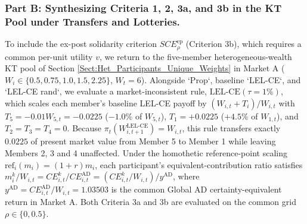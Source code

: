 \documentclass[11pt,a4paper]{article}
\theoremstyle{definition}
\theoremstyle{plain}
\theoremstyle{remark}
\newcommand{\1}{\mathbf{1}}
\begin{document}
\subsubsection*{Part B: Synthesizing Criteria 1, 2, 3a, and 3b in the KT Pool under Transfers and Lotteries.}
To include the ex-post solidarity criterion $SCE_\rho^{\text{ep}}$ (Criterion 3b), which requires a common per-unit utility $v$, we return to the five-member heterogeneous-wealth KT pool of Section \ref{Sect:Het_Participants_Unique_Weights} in Market A ($W_i \in \{0.5, 0.75, 1.0, 1.5, 2.25\}$, $W_t = 6$). Alongside `Prop`, baseline `LEL-CE`, and `LEL-CE rand`, we evaluate a market-inconsistent rule, $\text{LEL-CE}(\tau = 1\%)$, which scales each member's baseline LEL-CE payoff by $(W_{i,t} + T_i)/W_{i,t}$ with $T_5 = -0.01 W_{5,t} = -0.0225$ ($-1.0\%$ of $W_{5,t}$), $T_1 = +0.0225$ ($+4.5\%$ of $W_{1,t}$), and $T_2 = T_3 = T_4 = 0$. Because $\pi_t(W_{i,t+1}^{\text{LEL-CE}}) = W_{i,t}$, this rule transfers exactly $0.0225$ of present market value from Member 5 to Member 1 while leaving Members 2, 3 and 4 unaffected. Under the homothetic reference-point scaling $\text{ref}_i(m_i) = (1+r)m_i$, each participant's equivalent-contribution ratio satisfies $m_i^k / W_{i,t} = CE_{i,t}^k / CE_{i,t}^{\text{AD}} = (CE_{i,t}^k / W_{i,t}) / y^{\text{AD}}$, where $y^{\text{AD}} = CE_{i,t}^{\text{AD}} / W_{i,t} = 1.03503$ is the common Global AD certainty-equivalent return in Market A. Both Criteria 3a and 3b are evaluated on the common grid $\rho \in \{0, 0.5\}$.
\end{document}
